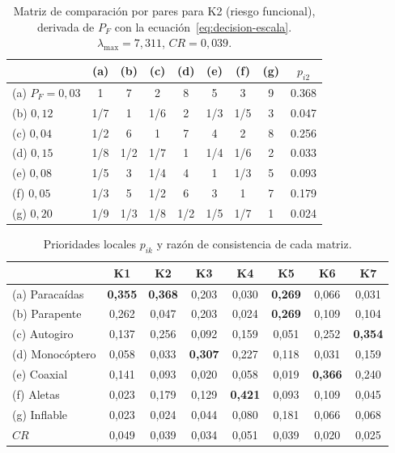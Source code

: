 \begin{table}[H]
\centering\small
\caption{Matriz de comparación por pares para K2 (riesgo funcional), derivada de $P_F$
con la ecuación~\eqref{eq:decision-escala}. $\lambda_{\max}=7{,}311$, $CR=0{,}039$.}
\label{tab:decision-k2}
\begin{tabular}{@{}l*{7}{c}c@{}}
\toprule
 & (a) & (b) & (c) & (d) & (e) & (f) & (g) & $p_{i2}$\\\midrule
(a) $P_F=0{,}03$ & 1 & 7 & 2 & 8 & 5 & 3 & 9 & \num{0.368}\\
(b) $0{,}12$ & 1/7 & 1 & 1/6 & 2 & 1/3 & 1/5 & 3 & \num{0.047}\\
(c) $0{,}04$ & 1/2 & 6 & 1 & 7 & 4 & 2 & 8 & \num{0.256}\\
(d) $0{,}15$ & 1/8 & 1/2 & 1/7 & 1 & 1/4 & 1/6 & 2 & \num{0.033}\\
(e) $0{,}08$ & 1/5 & 3 & 1/4 & 4 & 1 & 1/3 & 5 & \num{0.093}\\
(f) $0{,}05$ & 1/3 & 5 & 1/2 & 6 & 3 & 1 & 7 & \num{0.179}\\
(g) $0{,}20$ & 1/9 & 1/3 & 1/8 & 1/2 & 1/5 & 1/7 & 1 & \num{0.024}\\
\bottomrule
\end{tabular}
\end{table}

\begin{table}[H]
\centering\small
\caption{Prioridades locales $p_{ik}$ y razón de consistencia de cada matriz.}
\label{tab:decision-locales}
\begin{tabular}{@{}l*{7}{c}@{}}
\toprule
 & K1 & K2 & K3 & K4 & K5 & K6 & K7\\\midrule
(a) Paracaídas  & \textbf{0,355} & \textbf{0,368} & 0,203 & 0,030 & \textbf{0,269} & 0,066 & 0,031\\
(b) Parapente   & 0,262 & 0,047 & 0,203 & 0,024 & \textbf{0,269} & 0,109 & 0,104\\
(c) Autogiro    & 0,137 & 0,256 & 0,092 & 0,159 & 0,051 & 0,252 & \textbf{0,354}\\
(d) Monocóptero & 0,058 & 0,033 & \textbf{0,307} & 0,227 & 0,118 & 0,031 & 0,159\\
(e) Coaxial     & 0,141 & 0,093 & 0,020 & 0,058 & 0,019 & \textbf{0,366} & 0,240\\
(f) Aletas      & 0,023 & 0,179 & 0,129 & \textbf{0,421} & 0,093 & 0,109 & 0,045\\
(g) Inflable    & 0,023 & 0,024 & 0,044 & 0,080 & 0,181 & 0,066 & 0,068\\\midrule
$CR$            & 0,049 & 0,039 & 0,034 & 0,051 & 0,039 & 0,020 & 0,025\\
\bottomrule
\end{tabular}
\end{table}

